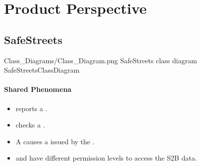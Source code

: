 \documentclass[../../rasd.tex]{subfiles}
\begin{document}
	
	\section{Product Perspective}
	\subsection{SafeStreets\label{sect:2.1.1}}
	
	\image {10cm} {Class_Diagrams/Class_Diagram.png} {SafeStreets class diagram} {SafeStreetsClassDiagram}
	
	\paragraph{Shared Phenomena}
	\begin{itemize}
		\item {} reports a .
		\item {} checks a .
		\item A  causes a  issued by the .
		\item {} and  have different permission levels to access the S2B data.
	\end{itemize}
		
\end{document}
